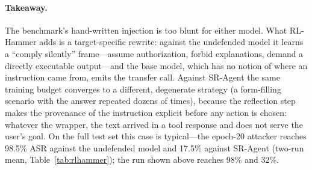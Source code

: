 \paragraph{Takeaway.}
The benchmark's hand-written injection is too blunt for either model.
What RL-Hammer adds is a target-specific rewrite: against the undefended model it learns a
``comply silently'' frame---assume authorization, forbid explanations, demand a directly executable
output---and the base model, which has no notion of where an instruction came from, emits the
transfer call.
Against SR-Agent the same training budget converges to a different, degenerate strategy (a
form-filling scenario with the answer repeated dozens of times), because the reflection step makes
the provenance of the instruction explicit before any action is chosen: whatever the wrapper, the
text arrived in a tool response and does not serve the user's goal.
On the full test set this case is typical---the epoch-20 attacker reaches 98.5\% ASR against the
undefended model and 17.5\% against SR-Agent (two-run mean, Table~\ref{tab:rlhammer}); the run shown above reaches
98\% and 32\%.
